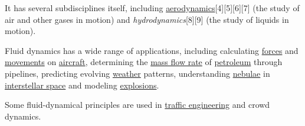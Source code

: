 \documentclass{article}
\begin{document}
\begin{enumerate}
	It has several subdisciplines itself, including \href{https://en.wikipedia.org/wiki/Aerodynamics}{aerodynamics}[4][5][6][7] (the study of air and other gases in motion) and \textit{hydrodynamics}[8][9] (the study of liquids in motion).
	
	Fluid dynamics has a wide range of applications, including calculating \href{https://en.wikipedia.org/wiki/Force}{forces} and \href{https://en.wikipedia.org/wiki/Moment_(physics)}{movements} on \href{https://en.wikipedia.org/wiki/Aircraft}{aircraft}, determining the \href{https://en.wikipedia.org/wiki/Mass_flow_rate}{mass flow rate} of \href{https://en.wikipedia.org/wiki/Petroleum}{petroleum} through pipelines, predicting evolving \href{https://en.wikipedia.org/wiki/Weather}{weather} patterns, understanding \href{https://en.wikipedia.org/wiki/Nebula}{nebulae} in \href{https://en.wikipedia.org/wiki/Interstellar_space}{interstellar space} and modeling \href{https://en.wikipedia.org/wiki/Explosions}{explosions}.
	
	Some fluid-dynamical principles are used in \href{https://en.wikipedia.org/wiki/Traffic_engineering_(transportation)}{traffic engineering} and crowd dynamics.
\end{enumerate}
\end{document}
